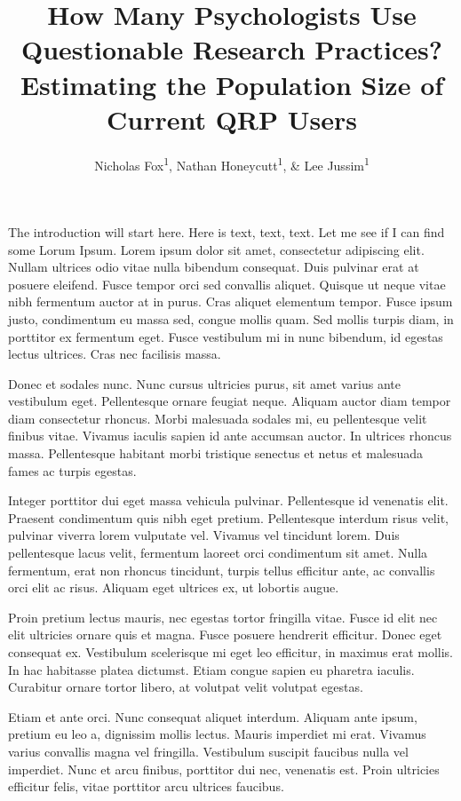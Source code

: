 \documentclass[man]{apa6}
\title{How Many Psychologists Use Questionable Research Practices? Estimating
the Population Size of Current QRP Users}
\author{Nicholas Fox\textsuperscript{1}, Nathan Honeycutt\textsuperscript{1}, \& Lee Jussim\textsuperscript{1}}
\affiliation{
    \vspace{0.5cm}
          \textsuperscript{1} Rutgers University, New Brunswick New Jersey, USA  }
\theoremstyle{definition}
\theoremstyle{definition}
\theoremstyle{definition}
\theoremstyle{remark}
\begin{document}
\maketitle

\setcounter{secnumdepth}{0}



The introduction will start here. Here is text, text, text. Let me see
if I can find some Lorum Ipsum. Lorem ipsum dolor sit amet, consectetur
adipiscing elit. Nullam ultrices odio vitae nulla bibendum consequat.
Duis pulvinar erat at posuere eleifend. Fusce tempor orci sed convallis
aliquet. Quisque ut neque vitae nibh fermentum auctor at in purus. Cras
aliquet elementum tempor. Fusce ipsum justo, condimentum eu massa sed,
congue mollis quam. Sed mollis turpis diam, in porttitor ex fermentum
eget. Fusce vestibulum mi in nunc bibendum, id egestas lectus ultrices.
Cras nec facilisis massa.

Donec et sodales nunc. Nunc cursus ultricies purus, sit amet varius ante
vestibulum eget. Pellentesque ornare feugiat neque. Aliquam auctor diam
tempor diam consectetur rhoncus. Morbi malesuada sodales mi, eu
pellentesque velit finibus vitae. Vivamus iaculis sapien id ante
accumsan auctor. In ultrices rhoncus massa. Pellentesque habitant morbi
tristique senectus et netus et malesuada fames ac turpis egestas.

Integer porttitor dui eget massa vehicula pulvinar. Pellentesque id
venenatis elit. Praesent condimentum quis nibh eget pretium.
Pellentesque interdum risus velit, pulvinar viverra lorem vulputate vel.
Vivamus vel tincidunt lorem. Duis pellentesque lacus velit, fermentum
laoreet orci condimentum sit amet. Nulla fermentum, erat non rhoncus
tincidunt, turpis tellus efficitur ante, ac convallis orci elit ac
risus. Aliquam eget ultrices ex, ut lobortis augue.

Proin pretium lectus mauris, nec egestas tortor fringilla vitae. Fusce
id elit nec elit ultricies ornare quis et magna. Fusce posuere hendrerit
efficitur. Donec eget consequat ex. Vestibulum scelerisque mi eget leo
efficitur, in maximus erat mollis. In hac habitasse platea dictumst.
Etiam congue sapien eu pharetra iaculis. Curabitur ornare tortor libero,
at volutpat velit volutpat egestas.

Etiam et ante orci. Nunc consequat aliquet interdum. Aliquam ante ipsum,
pretium eu leo a, dignissim mollis lectus. Mauris imperdiet mi erat.
Vivamus varius convallis magna vel fringilla. Vestibulum suscipit
faucibus nulla vel imperdiet. Nunc et arcu finibus, porttitor dui nec,
venenatis est. Proin ultricies efficitur felis, vitae porttitor arcu
ultrices faucibus.
\end{document}
